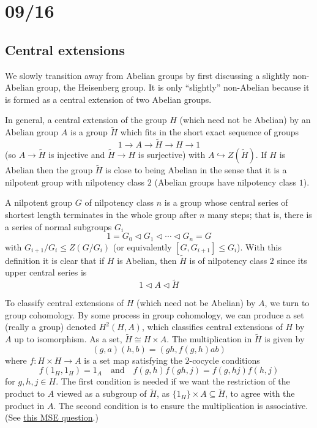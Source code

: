 \documentclass[../../rtnotes.tex]{subfiles}
\begin{document}
\section{09/16}
\subsection{Central extensions}
We slowly transition away from Abelian groups by first discussing a slightly non-Abelian group, the Heisenberg group. It is only ``slightly'' non-Abelian because it is formed as a central extension of two Abelian groups. 

In general, a central extension of the group $H$ (which need not be Abelian) by an Abelian group $A$ is a group $\tilde H$ which fits in the short exact sequence of groups 
\[1\to A\to \widetilde H\to H \to 1\]
(so $A\to \widetilde H$ is injective and $\widetilde H \to H$ is surjective)  with $A\hookrightarrow Z(\widetilde H)$. If $H$ is Abelian then the group $\widetilde H$ is close to being Abelian in the sense that it is a nilpotent group with nilpotency class $2$ (Abelian groups have nilpotency class $1$). 

A nilpotent group $G$ of nilpotency class $n$ is a group whose central series of shortest length terminates in the whole group after $n$ many steps; that is, there is a series of normal subgroups $G_i$   
\[1=G_0\lhd G_1\lhd\cdots\lhd G_n = G\]
with $G_{i+1}/G_i\leq Z(G/G_i)$ (or equivalently $[G,G_{i+1}]\leq G_i$).
With this definition it is clear that if $H$ is Abelian, then $\widetilde H$ is of nilpotency class $2$ since its upper central series is
\[1\lhd A\lhd \widetilde H\]

To classify central extensions of $H$ (which need not be Abelian) by $A$, we turn to group cohomology. By some process in group cohomology, we can produce a set (really a group) denoted $H^2(H,A)$, which classifies central extensions of $H$ by $A$ up to isomorphism. As a set, $\widetilde H \cong H\times A$. The multiplication in $\widetilde H$ is given by 
\[(g,a)(h,b) = (gh,f(g,h)ab)\]
where $f\colon H\times H \to A$ is a set map satisfying the $2$-cocycle conditions
\[f(1_H,1_H) = 1_A\quad\text{and}\quad f(g,h)f(gh,j) = f(g,hj)f(h,j)\]
for $g,h,j\in H$. The first condition is needed if we want the restriction of the product to $A$ viewed as a subgroup of $\widetilde H$, as $\{1_H\}\times A \subseteq \widetilde H$, to agree with the product in $A$. The second condition is to ensure the multiplication is associative. (See \href{https://www.mathematik.uni-muenchen.de/~schotten/LNP-cft-pdf/03_978-3-540-68625-5_Ch03_23-08-08.pdf}{this MSE question}.)
\end{document}
